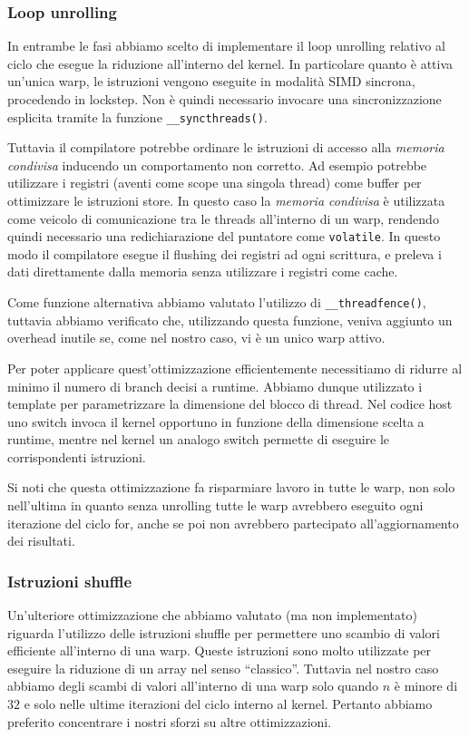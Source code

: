 \documentclass[a4paper]{article}   %
\begin{document}
\subsubsection{Loop unrolling}
In entrambe le fasi abbiamo scelto di implementare il loop unrolling relativo al ciclo che esegue la riduzione all’interno del kernel. In particolare quanto è attiva un’unica warp, le istruzioni vengono eseguite in modalità SIMD sincrona, procedendo in lockstep. Non è quindi necessario invocare una sincronizzazione esplicita tramite la funzione {\tt \_\_syncthreads()}.

Tuttavia il compilatore potrebbe ordinare le istruzioni di accesso alla \emph{memoria condivisa} inducendo un comportamento non corretto. Ad esempio potrebbe utilizzare i registri (aventi come scope una singola thread) come buffer per ottimizzare le istruzioni store.
In questo caso la \emph{memoria condivisa} è utilizzata come veicolo di comunicazione tra le threads all’interno di un warp, rendendo quindi necessario una redichiarazione del puntatore come {\tt volatile}. In questo modo il compilatore esegue il flushing dei registri ad ogni scrittura, e preleva i dati direttamente dalla memoria senza utilizzare i registri come cache.

Come funzione alternativa abbiamo valutato l’utilizzo di {\tt \_\_threadfence()}, tuttavia abbiamo verificato che, utilizzando questa funzione, veniva aggiunto un overhead inutile se, come nel nostro caso, vi è un unico warp attivo.

Per poter applicare quest’ottimizzazione efficientemente necessitiamo di ridurre al minimo il numero di branch decisi a runtime. Abbiamo dunque utilizzato i template per parametrizzare la dimensione del blocco di thread. Nel codice host uno switch invoca il kernel opportuno in funzione della dimensione scelta a runtime, mentre nel kernel un analogo switch permette di eseguire le corrispondenti istruzioni.

Si noti che questa ottimizzazione fa risparmiare lavoro in tutte le warp, non solo nell’ultima in quanto senza unrolling tutte le warp avrebbero eseguito ogni iterazione del ciclo for, anche se poi non avrebbero partecipato all’aggiornamento dei risultati.

\subsubsection{Istruzioni shuffle}
Un’ulteriore ottimizzazione che abbiamo valutato (ma non implementato) riguarda l’utilizzo delle istruzioni shuffle per permettere uno scambio di valori efficiente all’interno di una warp. Queste istruzioni sono molto utilizzate per eseguire la riduzione di un array nel senso “classico”. Tuttavia nel nostro caso abbiamo degli scambi di valori all’interno di una warp solo quando $n$ è minore di $32$ e solo nelle ultime iterazioni del ciclo interno al kernel. Pertanto abbiamo preferito concentrare i nostri sforzi su altre ottimizzazioni.
\end{document}
